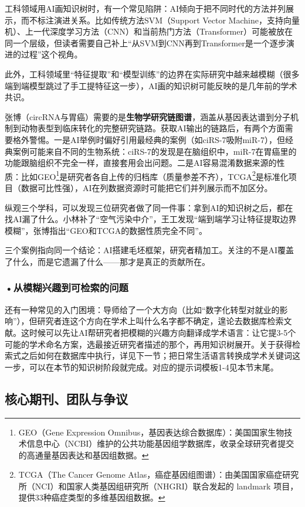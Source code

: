 工科领域用AI画知识树时，有一个常见陷阱：AI倾向于把不同时代的方法并列展示，而不标注演进关系。比如传统方法SVM（Support Vector Machine，支持向量机）、上一代深度学习方法（CNN）和当前热门方法（Transformer）可能被放在同一个层级，但读者需要自己补上``从SVM到CNN再到Transformer是一个逐步演进的过程''这个视角。

此外，工科领域里``特征提取''和``模型训练''的边界在实际研究中越来越模糊（很多端到端模型跳过了手工提特征这一步），AI画的知识树可能反映的是几年前的学术共识。

张博（circRNA与胃癌）需要的是\textbf{生物学研究链图谱}，涵盖从基因表达谱到分子机制到动物表型到临床转化的完整研究链路。获取AI输出的链路后，有两个方面需要格外警惕。一是AI举例时偏好引用最经典的案例（如ciRS-7吸附miR-7），但经典案例可能来自不同的生物系统：ciRS-7的发现是在脑组织中，miR-7在胃癌里的功能跟脑组织不完全一样，直接套用会出问题。二是AI容易混淆数据来源的性质：比如GEO\footnote{GEO（Gene Expression Omnibus，基因表达综合数据库）：美国国家生物技术信息中心（NCBI）维护的公共功能基因组学数据库，收录全球研究者提交的高通量基因表达和基因组数据。}是研究者各自上传的归档库（质量参差不齐），TCGA\footnote{TCGA（The Cancer Genome Atlas，癌症基因组图谱）：由美国国家癌症研究所（NCI）和国家人类基因组研究所（NHGRI）联合发起的 landmark 项目，提供33种癌症类型的多维基因组数据。}是标准化项目（数据可比性强），AI在列数据资源时可能把它们并列展示而不加区分。

\medskip
纵观三个学科，可以发现三位研究者做了同一件事：拿到AI的知识树之后，都在找AI漏了什么。小林补了``空气污染中介''，王工发现``端到端学习让特征提取边界模糊''，张博指出``GEO和TCGA的数据性质完全不同''。

三个案例指向同一个结论：AI搭建毛坯框架，研究者精加工。关注的不是AI覆盖了什么，而是它遗漏了什么——那才是真正的贡献所在。

\subsubsection*{\textbf{•从模糊兴趣到可检索的问题}}还有一种常见的入门困境：导师给了一个大方向（比如``数字化转型对就业的影响''），但研究者连这个方向在学术上叫什么名字都不确定，遑论去数据库检索文献。这时候可以先让AI帮研究者把模糊的兴趣方向翻译成学术语言：让它提3-5个可能的学术命名方案，选最接近研究者描述的那个，再用知识树展开。关于获得检索式之后如何在数据库中执行，详见下一节；把日常生活语言转换成学术关键词这一步，可以在本节的知识树阶段就完成。对应的提示词模板1-4见本节末尾。

\subsection{核心期刊、团队与争议}


